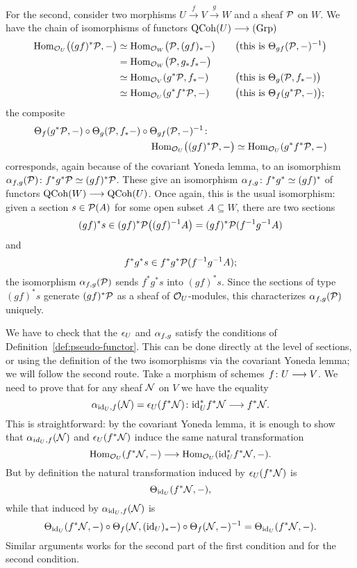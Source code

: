 \begin{3   FIBERED CATEGORIES}
\begin{3.2 Examples of fibered categories}
For the second, consider two morphisms $U \xrightarrow{f} V \xrightarrow{g} W$ and a \qc sheaf $\mathcal{P}$ on $W$. We have the chain of isomorphisms of functors $\qcoh U \arr \catgrp$
   \begin{alignat*}{3}
   \operatorname{Hom}_{\mathcal{O}_U}\bigl((gf)^*\mathcal{P}, -\bigr)
   &{}\simeq \operatorname{Hom}_{\mathcal{O}_W}\bigl(\mathcal{P}, (gf)_*-\bigr)
   && \quad\bigl(\text{this is $\Theta_{gf}(\mathcal{P},-)^{-1}$}\bigr)\\
   &{}=\operatorname{Hom}_{\mathcal{O}_W}\bigl(\mathcal{P}, g_*f_*-\bigr)\\
   &{} \simeq \operatorname{Hom}_{\mathcal{O}_V}(g^*\mathcal{P}, f_*-)
   && \quad\bigl(\text{this is $\Theta_{g}(\mathcal{P},f_*-)$}\bigr)\\
   &{} \simeq \operatorname{Hom}_{\mathcal{O}_U}(g^*f^*\mathcal{P}, -)
   && \quad\bigl(\text{this is $\Theta_{f}(g^*\mathcal{P},-)$}\bigr);
   \end{alignat*}
the composite
   \begin{align*}
   \Theta_{f}(g^*\mathcal{P},-) \circ \Theta_{g}(\mathcal{P}, f_*-)
   \circ {}&\Theta_{gf}(\mathcal{P},-)^{-1} \colon\\
   &\operatorname{Hom}_{\mathcal{O}_U}\bigl((gf)^*\mathcal{P}, -\bigr)
   \simeq \operatorname{Hom}_{\mathcal{O}_U}(g^*f^*\mathcal{P}, -)
   \end{align*}
corresponds, again because of the covariant Yoneda lemma, to  an isomorphism $\alpha_{f,g}(\mathcal{P}) \colon f^*g^*\mathcal{P}\simeq (gf)^*\mathcal{P}$. These give an isomorphism $\alpha_{f,g} \colon f^*g^* \simeq (gf)^*$ of functors $\qcoh W \arr \qcoh U$. Once again, this is the usual isomorphism: given a section $s \in \mathcal{P}(A)$ for some open subset $A \subseteq W$, there are two sections
   \[
   (gf)^*s \in (gf)^*\mathcal{P}\bigl((gf)^{-1} A\bigr) =
   (gf)^*\mathcal{P}(f ^{-1} g ^{-1} A)
   \]
and
   \[
   f^* g^* s \in f^* g^* \mathcal{P}(f ^{-1} g ^{-1} A);
   \]
the isomorphism $\alpha_{f,g}(\mathcal{P})$ sends $f^* g^* s$ into $(gf)^*s$. Since the sections of type $(gf)^*s$ generate $(gf)^*\mathcal{P}$ as a sheaf of $\mathcal{O}_U$-modules, this characterizes $\alpha_{f,g}(\mathcal{P})$ uniquely.


We have to check that the $\epsilon_U$ and $\alpha_{f,g}$ satisfy the conditions of Definition~\ref{def:pseudo-functor}. This can be done directly at the level of sections, or using the definition of the two isomorphisms via the covariant Yoneda lemma; we will follow the second route. Take a morphism of schemes $f \colon U \arr V$. We need to prove that for any \qc sheaf $\mathcal{N}$ on $V$ we have the equality
   \[
   \isoass_{\id_U,f}(\cN) = \isoiden_U(f^*\cN) \colon 
   \id_U^*f^* \cN \arr f^*\cN.
   \]
This is straightforward: by the covariant Yoneda lemma, it is enough to show that $\alpha_{id_U,f}(\mathcal{N})$ and $\epsilon_U(f^*\mathcal{N})$ induce the same natural transformation
   \[
   \hom_{\cO_U}(f^* \cN, - ) \arr
   \hom_{\cO_U}(\id_U^*f^* \cN, - ).
   \]
But by definition the natural transformation induced by $\epsilon_U(f^*\mathcal{N})$ is
   \[
   \Theta_{\mathrm{id}_U}(f^* \mathcal{N}, -),
   \]
while that induced by $ \alpha_{\mathrm{id}_U,f}(\mathcal{N}) $ is 
   \[
   \Theta_{\mathrm{id}_U}(f^* \mathcal{N}, -) \circ
   \Theta_f(\mathcal{N},(\mathrm{id}_U)_*-) \circ
   \Theta_f (\mathcal{N}, -)^{-1} = 
   \Theta_{\mathrm{id}_U}(f^* \mathcal{N}, -).
   \]
Similar arguments works for the second part of the first condition and for the second condition.


\end{3.2 Examples of fibered categories}
\end{3   FIBERED CATEGORIES}
